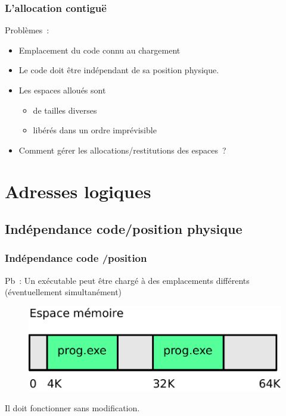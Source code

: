 \begin{frame}
  \frametitle{L'allocation contiguë}
  Problèmes~:
  \begin{itemize}
  \item Emplacement du code connu au \alert{chargement}
  \item[\ding{212}] Le code doit être \alert{indépendant} de sa position physique.
  \vspace{0.5cm}
  \item Les espaces \alert{alloués} sont 
    \begin{itemize}
    \item de \alert{tailles diverses}
    \item \alert{libérés} dans un ordre imprévisible 
    \end{itemize}
  \item[\ding{212}] Comment gérer les allocations/restitutions des espaces~?    
  \end{itemize}
\end{frame}


\section{Adresses logiques}



\subsection{Indépendance code/position physique}


\begin{frame}
  \frametitle{Indépendance code /position}
  Pb~: Un exécutable peut être \alert{chargé} à des emplacements
  différents (éventuellement simultanément)
  \vspace{0.5cm}
  \begin{figure}
    \includegraphics[width=0.8\linewidth]{fig2/indep-code-adr-physique}
  \end{figure}
  \vspace{0.5cm}
  Il doit fonctionner sans modification.
\end{frame}

